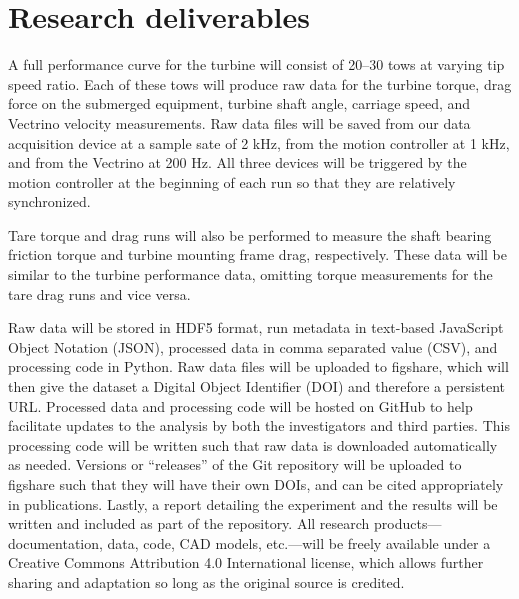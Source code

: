 \documentclass[14pt,letterpaper]{scrreprt}
\begin{document}
\chapter{Research deliverables}

A full performance curve for the turbine will consist of 20--30 tows at varying
tip speed ratio. Each of these tows will produce raw data for the turbine
torque, drag force on the submerged equipment, turbine shaft angle, carriage
speed, and Vectrino velocity measurements. Raw data files will be saved from our
data acquisition device at a sample sate of 2 kHz, from the motion controller at
1 kHz, and from the Vectrino at 200 Hz. All three devices will be triggered by
the motion controller at the beginning of each run so that they are relatively
synchronized.

Tare torque and drag runs will also be performed to measure the shaft bearing
friction torque and turbine mounting frame drag, respectively. These data will
be similar to the turbine performance data, omitting torque measurements for the
tare drag runs and vice versa.

Raw data will be stored in HDF5 format, run metadata in text-based JavaScript
Object Notation (JSON), processed data in comma separated value (CSV), and
processing code in Python. Raw data files will be uploaded to figshare, which
will then give the dataset a Digital Object Identifier (DOI) and therefore a
persistent URL. Processed data and processing code will be hosted on GitHub to
help facilitate updates to the analysis by both the investigators and third
parties. This processing code will be written such that raw data is downloaded
automatically as needed. Versions  or ``releases'' of the Git repository will be
uploaded to figshare such that they will have their own DOIs, and can be cited
appropriately in publications. Lastly, a report detailing the experiment and the
results will be written and included as part of the repository. All research
products---documentation, data, code, CAD models, etc.---will be freely
available under a Creative Commons Attribution 4.0 International license, which
allows further sharing and adaptation so long as the original source is
credited. 

\renewcommand{\bibname}{References}


\end{document}
